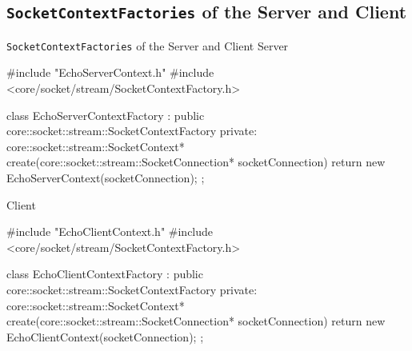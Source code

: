 ﻿\subsection{\texttt{SocketContextFactories} of the Server and Client}

\begin{frame}[fragile]{\texttt{SocketContextFactories} of the Server and Client}
  Server
  \begin{cppcode}[autogobble=true, caption={\alert{SocketContextFactory} of the server.},captionpos=b,morekeywords={[2]create},morekeywords={[3]{socketConnection}}]
    #include "EchoServerContext.h"
    #include <core/socket/stream/SocketContextFactory.h>

    class EchoServerContextFactory : public core::socket::stream::SocketContextFactory {
    private:
        core::socket::stream::SocketContext* create(core::socket::stream::SocketConnection* socketConnection) {
            return new EchoServerContext(socketConnection);
        }
    };
  \end{cppcode}
  Client
  \begin{cppcode}[autogobble=true, caption={\alert{SocketContextFactory} of the client.},captionpos=b,morekeywords={[2]create},morekeywords={[3]{socketConnection}}]
    #include "EchoClientContext.h"
    #include <core/socket/stream/SocketContextFactory.h>

    class EchoClientContextFactory : public core::socket::stream::SocketContextFactory {
    private:
        core::socket::stream::SocketContext* create(core::socket::stream::SocketConnection* socketConnection) {
            return new EchoClientContext(socketConnection);
        }
    };
  \end{cppcode}
\end{frame}
